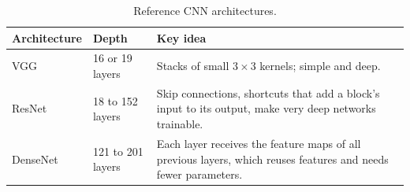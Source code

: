 \begin{table}[t]
  \centering
  \caption{Reference CNN architectures.}
  \label{tab:cnn_architectures}
  \small
  \begin{tabular}{@{}p{}p{}p{}@{}}
    \toprule
    Architecture & Depth & Key idea \\
    \midrule
    VGG      & 16 or 19 layers  & Stacks of small $3 \times 3$ kernels; simple and deep. \\
    ResNet   & 18 to 152 layers & Skip connections, shortcuts that add a block's input to its output, make very deep networks trainable. \\
    DenseNet & 121 to 201 layers & Each layer receives the feature maps of all previous layers, which reuses features and needs fewer parameters. \\
    \bottomrule
  \end{tabular}
\end{table}

